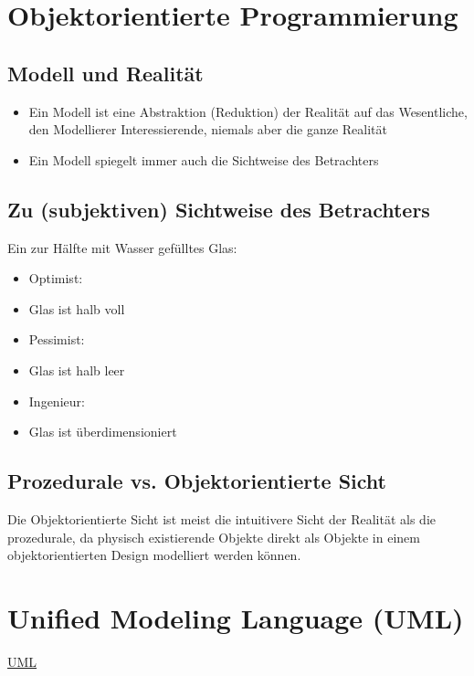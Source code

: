 \section{Objektorientierte Programmierung}
\label{sec:Objektorientierte Programmierung}

\subsection{Modell und Realität}
\label{Modell und Realität}
\begin{itemize}
	\item Ein Modell ist eine Abstraktion (Reduktion) der Realität auf das Wesentliche, den Modellierer Interessierende, niemals aber die ganze Realität
	\item Ein Modell spiegelt immer auch die Sichtweise des Betrachters
\end{itemize}

\subsection{Zu (subjektiven) Sichtweise des Betrachters}
\label{Zur (subjektiven) Sichtweise des Betrachters}
Ein zur Hälfte mit Wasser gefülltes Glas:
\begin{itemize}
	\item Optimist:
	\item[\-] Glas ist halb voll
	\item Pessimist:
	\item[\-] Glas ist halb leer
	\item Ingenieur:
	\item[\-] Glas ist überdimensioniert
\end{itemize}

\subsection{Prozedurale vs. Objektorientierte Sicht}
\label{sec:Prozedurale vs. Objektorientierte Sicht}
Die Objektorientierte Sicht ist meist die intuitivere Sicht der Realität als die prozedurale, da physisch existierende Objekte direkt als Objekte in einem objektorientierten Design modelliert werden können.

\section{Unified Modeling Language (UML)}
\label{sec:Unified Modeling Language}
\href{www.uml.org}{UML}

